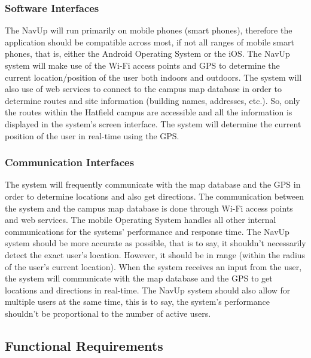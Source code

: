 \documentclass[12pt, a4paper]{article}
\begin{document}
	\subsubsection{Software Interfaces}
The NavUp will run primarily on mobile phones (smart phones), therefore the application should be compatible across most, 
if not all ranges of mobile smart phones, that is, either the Android Operating System or the iOS. The NavUp system will make 
use of the Wi-Fi access points and GPS to determine the current location/position of the user both indoors and outdoors. The 
system will also use of web services to connect to the campus map database in order to determine routes and site information (building names, addresses, etc.). 
So, only the routes within the Hatfield campus are accessible and all the information is displayed in the system’s screen interface. 
The system will determine the current position of the user in real-time using the GPS. \\

	\subsubsection{Communication Interfaces}
{The system will frequently communicate with the map database and the GPS in order to determine 
locations and also get directions. The communication between the system and the campus map database is done through Wi-Fi access points and web services. 
The mobile Operating System handles all other internal communications for the systems’ performance and response time. 
The NavUp system should be more accurate as possible, that is to say, it shouldn’t necessarily detect the exact user’s location. 
However, it should be in range (within the radius of the user’s current location). When the system receives an input from the user, 
the system will communicate with the map database and the GPS to get locations and directions in real-time. The NavUp system should also allow 
for multiple users at the same time, this is to say, the system’s performance shouldn’t be proportional to the number of active users.} \\
	\subsection{Functional Requirements}
\end{document}
